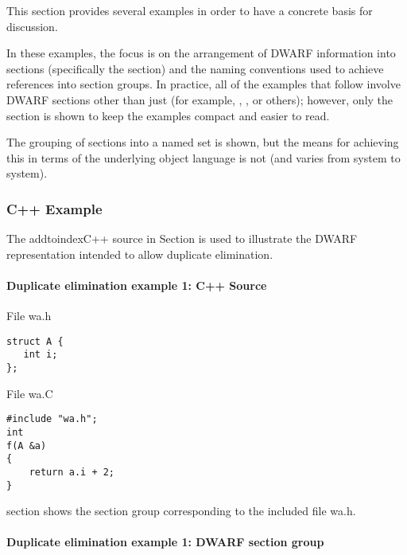 This section provides several 
examples in order to have a
concrete basis for discussion.

In these examples, the focus is on the arrangement of DWARF
information into sections (specifically the 
section) and the naming conventions used to achieve references
into section groups. In practice, all of the examples that
follow involve DWARF sections other than just 
(for example, , 
, or others);
however, only the 
section is shown to keep the
examples compact and easier to read.

The grouping of sections into a named set is shown, but the means for achieving this in terms of
the underlying object language is not (and varies from system to system).

\subsubsection{C++ Example}

The addtoindex{C++} source 
in 
Section 
is used to illustrate the DWARF
representation intended to allow duplicate elimination.

\paragraph{Duplicate elimination example 1: C++ Source} 
\label{app:duplicateeliminationexample1csource}

File wa.h

\begin{lstlisting}
struct A {
   int i;
};
\end{lstlisting}

File wa.C

\begin{lstlisting}
#include "wa.h";
int
f(A &a)
{
    return a.i + 2;
}
\end{lstlisting}


section 
shows the section group corresponding to the included file 
wa.h.


\paragraph{Duplicate elimination example 1: DWARF section group} 

